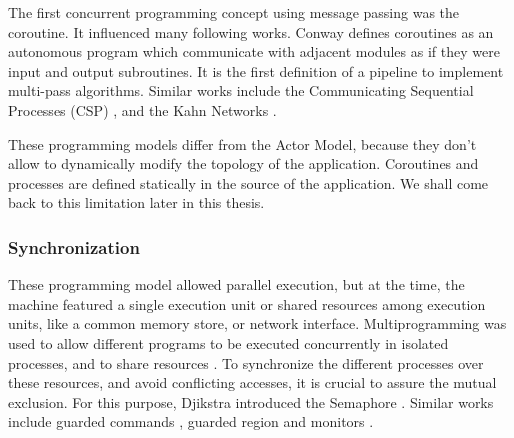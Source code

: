 The first concurrent programming concept using message passing was the coroutine.
It influenced many following works.
Conway defines coroutines as an autonomous program which communicate with adjacent modules as if they were input and output subroutines.\cite{Conway1963}
It is the first definition of a pipeline to implement multi-pass algorithms.
Similar works include the Communicating Sequential Processes (CSP) \cite{Hoare1978, Brookes1984}, and the Kahn Networks \cite{Kahn1974, Kahn1976}.



These programming models differ from the Actor Model, because they don't allow to dynamically modify the topology of the application.
Coroutines and processes are defined statically in the source of the application.
We shall come back to this limitation later in this thesis.


\subsubsection{Synchronization}

These programming model allowed parallel execution, but at the time, the machine featured a single execution unit or shared resources among execution units, like a common memory store, or network interface.
Multiprogramming was used to allow different programs to be executed concurrently in isolated processes, and to share resources \cite{Dijkstra1968}.
To synchronize the different processes over these resources, and avoid conflicting accesses, it is crucial to assure the mutual exclusion.
For this purpose, Djikstra introduced the Semaphore \cite{Dijkstra}.
Similar works include guarded commands \cite{Dijkstra1975}, guarded region \cite{Hansen1978a} and monitors \cite{Hoare1974}.


